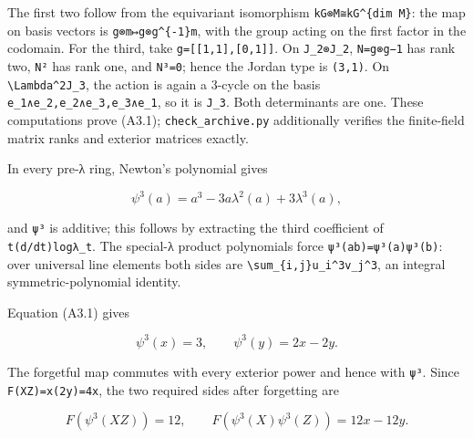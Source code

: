 \documentclass[
  10pt,
]{article}
\begin{document}
The first two follow from the equivariant isomorphism
\texttt{\small kG⊗\allowbreak{}M≅kG\textasciicircum{}\{dim M\}}: the map
on basis vectors is
\texttt{\small g⊗\allowbreak{}m↦g⊗\allowbreak{}g\textasciicircum{}\{-\allowbreak{}1\}m},
with the group acting on the first factor in the codomain. For the
third, take
\texttt{\small g=\allowbreak{}[\allowbreak{}[\allowbreak{}1,\allowbreak{}1]\allowbreak{},\allowbreak{}[\allowbreak{}0,\allowbreak{}1]\allowbreak{}]\allowbreak{}}.
On \texttt{\small J\_\allowbreak{}2⊗\allowbreak{}J\_\allowbreak{}2},
\texttt{\small N=\allowbreak{}g⊗\allowbreak{}g−1} has rank two,
\texttt{\small N²} has rank one, and \texttt{\small N³=\allowbreak{}0};
hence the Jordan type is
\texttt{\small (\allowbreak{}3,\allowbreak{}1)\allowbreak{}}. On
\texttt{\small \textbackslash{}Lambda\textasciicircum{}2J\_\allowbreak{}3},
the action is again a 3-cycle on the basis
\texttt{\small e\_\allowbreak{}1∧e\_\allowbreak{}2,\allowbreak{}e\_\allowbreak{}2∧e\_\allowbreak{}3,\allowbreak{}e\_\allowbreak{}3∧e\_\allowbreak{}1},
so it is \texttt{\small J\_\allowbreak{}3}. Both determinants are one.
These computations prove (A3.1);
\texttt{\small check\_\allowbreak{}archive.py} additionally verifies the
finite-field matrix ranks and exterior matrices exactly.

In every pre-λ ring, Newton's polynomial gives

\[
\psi^3(a)=a^3-3a\lambda^2(a)+3\lambda^3(a),
\]

and \texttt{\small ψ³} is additive; this follows by extracting the third
coefficient of
\texttt{\small t(\allowbreak{}d/\allowbreak{}dt)\allowbreak{}logλ\_\allowbreak{}t}.
The special-λ product polynomials force
\texttt{\small ψ³(\allowbreak{}ab)\allowbreak{}=\allowbreak{}ψ³(\allowbreak{}a)\allowbreak{}ψ³(\allowbreak{}b)\allowbreak{}}:
over universal line elements both sides are
\texttt{\small \textbackslash{}sum\_\allowbreak{}\{i,\allowbreak{}j\}u\_\allowbreak{}i\textasciicircum{}3v\_\allowbreak{}j\textasciicircum{}3},
an integral symmetric-polynomial identity.

Equation (A3.1) gives

\[
\psi^3(x)=3,\qquad \psi^3(y)=2x-2y.
\]

The forgetful map commutes with every exterior power and hence with
\texttt{\small ψ³}. Since
\texttt{\small F(\allowbreak{}XZ)\allowbreak{}=\allowbreak{}x(\allowbreak{}2y)\allowbreak{}=\allowbreak{}4x},
the two required sides after forgetting are

\[
F(\psi^3(XZ))=12,
\qquad F(\psi^3(X)\psi^3(Z))=12x-12y.
\]
\end{document}
